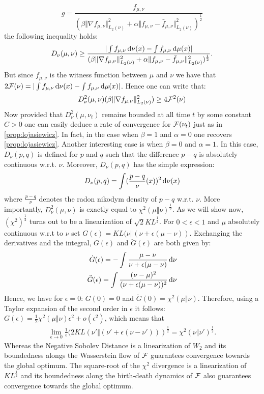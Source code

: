 \[
g = \frac{f_{\mu,\nu}}{(\beta \Vert \nabla f_{\mu,\nu} \Vert^2_{L_2(\nu)} +\alpha  \Vert f_{\mu,\nu}- \bar{f}_{\mu,\nu}  \Vert^2_{L_2(\nu)} )^\frac{1}{2}}
\]
the following inequality holds:
\[
D_{\nu}(\mu,\nu) \geq \frac{\vert \int f_{\mu,\nu} \mathop{}\!\mathrm{d} \nu(x) -   \int f_{\mu,\nu} \mathop{}\!\mathrm{d}\mu(x)\vert }{(\beta \Vert \nabla f_{\mu,\nu} \Vert^2_{L_2(\nu)} +\alpha  \Vert f_{\mu,\nu}- \bar{f}_{\mu,\nu}  \Vert^2_{L_2(\nu)})^{\frac{1}{2}} }.
\]
But since $f_{\mu,\nu}$ is the witness function between $\mu$ and $\nu$ we have that $2{{\mathcal F}}(\nu) = \vert \int f_{\mu,\nu} \mathop{}\!\mathrm{d} \nu(x) - \int f_{\mu,\nu} \mathop{}\!\mathrm{d} \mu(x)\vert $. Hence one can write that:
\begin{align}
	D^2_{\nu}(\mu,\nu)(\beta \Vert \nabla f_{\mu,\nu} \Vert^2_{L_2(\nu)} ) \geq 4{{\mathcal F}}^2(\nu)
\end{align}
Now provided that $D^2_{\nu}(\mu,\nu_t)$ remains bounded at all time $t$ by some constant $C>0$ one can easily deduce a rate of convergence for ${{\mathcal F}}(\nu_t)$ just as in \cref{prop:lojasiewicz}. In fact, in the case when $\beta = 1$ and $\alpha =0$ one recovers \cref{prop:lojasiewicz}. Another interesting case is when $\beta =0$ and $\alpha=1$. In this case, $D_{\nu}(p,q)$ is defined for $p$ and $q$ such that the difference $p-q$ is absolutely continuous w.r.t. $\nu$. Moreover, $D_{\nu}(p,q)$ has the simple expression:
\[
D_{\nu}(p,q) = \int (\frac{p-q }{\nu }(x))^2 \mathop{}\!\mathrm{d} \nu(x)
\] 
where $\frac{ p-q }{ \nu }$ denotes the radon nikodym density of $p-q$ w.r.t. 
$\nu$. More importantly, $D^2_{\nu}(\mu,\nu)$ is exactly equal to $\chi^2(\mu\Vert \nu)^{\frac{1}{2}}$. 
As we will show now, $(\chi^2)^{\frac{1}{2}}$ turns out to be a linearization of $\sqrt{2} KL^{\frac{1}{2}}$.
For $0<\epsilon< 1$ and $\mu$ absolutely continuous w.r.t to $\nu$ set $G(\epsilon) = KL(\nu \Vert (\nu+\epsilon(\mu-\nu) )$. Exchanging the derivatives and the integral, $\dot{G}(\epsilon)$ and $\ddot{G}(\epsilon)$ are both given by:
\begin{align*}
	\dot{G}(\epsilon) = -\int \frac{\mu-\nu}{\nu +\epsilon(\mu-\nu)}\mathop{}\!\mathrm{d} \nu\\
	\ddot{G}(\epsilon) = \int \frac{(\nu-\mu)^2}{(\nu+\epsilon(\mu-\nu))^2} \mathop{}\!\mathrm{d} \nu
\end{align*}
Hence, we have for $\epsilon=0$:  $\dot{G}(0) = 0$ and $\ddot{G}(0) = \chi^2(\mu\Vert \nu)$. Therefore, using a Taylor expansion of the second order in $\epsilon$ it follows:
$G(\epsilon) =\frac{1}{2} \chi^2(\mu\Vert \nu) \epsilon^2 + o(\epsilon^2)$, which means that  
\begin{align}
	\lim_{\epsilon \rightarrow 0} \frac{1}{\epsilon}(2KL(\nu' \Vert (\nu'+\epsilon(\nu-\nu') ) )^{\frac{1}{2}}   = \chi^2(\nu\Vert \nu')^\frac{1}{2}.
\end{align}
Whereas the Negative Sobolev Distance is  a linearization of $W_2$ and its boundedness alongs the Wasserstein flow of ${{\mathcal F}}$ guarantees convergence towards the global optimum.  The square-root of the $\chi^2$ divergence is  a linearization of $KL^{\frac{1}{2}}$ and its boundedness along the birth-death dynamics of ${{\mathcal F}}$ also guarantees convergence towards the global optimum.  

